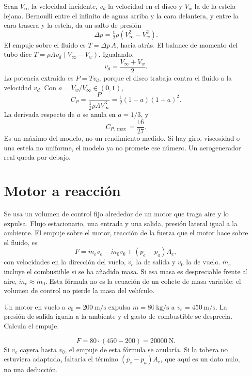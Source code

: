 Sean \(V_\infty\) la velocidad incidente, \(v_d\) la velocidad en el disco y \(V_w\) la de la estela lejana. Bernoulli entre el infinito de aguas arriba y la cara delantera, y entre la cara trasera y la estela, da un salto de presión
\[
\Delta p=\tfrac12\rho(V_\infty^2-V_w^2).
\]
El empuje sobre el fluido es \(T=\Delta p\, A\), hacia atrás. El balance de momento del tubo dice \(T=\rho A v_d(V_\infty-V_w)\). Igualando,
\begin{equation}
\label{eq:disco}
v_d=\frac{V_\infty+V_w}{2}.
\end{equation}
La potencia extraída es \(P=T v_d\), porque el disco trabaja contra el fluido a la velocidad \(v_d\). Con \(a=V_w/V_\infty\in(0,1)\),
\[
C_P=\frac{P}{\tfrac12\rho A V_\infty^3}=\tfrac12(1-a)(1+a)^2.
\]
La derivada respecto de \(a\) se anula en \(a=1/3\), y
\begin{equation}
\label{eq:betz}
C_{P,\max}=\frac{16}{27}.
\end{equation}
Es un máximo del modelo, no un rendimiento medido. Si hay giro, viscosidad o una estela no uniforme, el modelo ya no promete ese número. Un aerogenerador real queda por debajo.

\section{Motor a reacción}

Se usa un volumen de control fijo alrededor de un motor que traga aire y lo expulsa. Flujo estacionario, una entrada y una salida, presión lateral igual a la ambiente. El empuje sobre el motor, reacción de la fuerza que el motor hace sobre el fluido, es
\begin{equation}
\label{eq:empuje}
F=\dot m_e v_e-\dot m_0 v_0+(p_e-p_a)A_e,
\end{equation}
con velocidades en la dirección del vuelo, \(v_e\) la de salida y \(v_0\) la de vuelo. \(\dot m_e\) incluye el combustible si se ha añadido masa. Si esa masa es despreciable frente al aire, \(\dot m_e\approx\dot m_0\). Esta fórmula no es la ecuación de un cohete de masa variable: el volumen de control no pierde la masa del vehículo.

\begin{problembox}
Un motor en vuelo a \(v_0=\qty{200}{\metre\per\second}\) expulsa \(\dot m=\qty{80}{\kilogram\per\second}\) a \(v_e=\qty{450}{\metre\per\second}\). La presión de salida iguala a la ambiente y el gasto de combustible se desprecia. Calcula el empuje.
\end{problembox}
\begin{solutionbox}
\[
F=80\cdot(450-200)=\qty{20000}{\newton}.
\]
Si \(v_e\) cayera hasta \(v_0\), el empuje de esta fórmula se anularía. Si la tobera no estuviera adaptada, faltaría el término \((p_e-p_a)A_e\), que aquí es un dato nulo, no una deducción.
\end{solutionbox}

